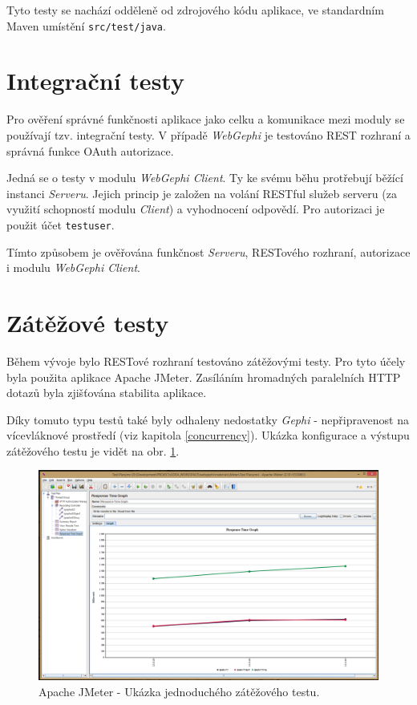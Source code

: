 \documentclass[thesis=M,czech]{FITthesis}[2014/05/6]
\begin{document}
Tyto testy se nachází odděleně od zdrojového kódu aplikace, ve standardním Maven
umístění \texttt{src/test/java}.

\section{Integrační testy}
Pro ověření správné funkčnosti aplikace jako celku a komunikace mezi moduly se
používají tzv. integrační testy. V případě \textit{WebGephi} je testováno REST
rozhraní a správná funkce OAuth autorizace.

Jedná se o testy v modulu \textit{WebGephi Client}. Ty ke svému běhu protřebují
běžící instanci \textit{Serveru}. Jejich princip je založen na volání RESTful
služeb serveru (za využití schopností modulu \textit{Client}) a vyhodnocení
odpovědí. Pro autorizaci je použit účet \texttt{testuser}.

Tímto způsobem je ověřována funkčnost \textit{Serveru}, RESTového rozhraní,
autorizace i modulu \textit{WebGephi Client}.

\section{Zátěžové testy}
Během vývoje bylo RESTové rozhraní testováno zátěžovými testy. Pro tyto účely
byla použita aplikace Apache JMeter\cite{jmeter}. Zasíláním
hromadných paralelních HTTP dotazů byla zjišťována stabilita aplikace. 

Díky tomuto typu testů také byly odhaleny nedostatky \textit{Gephi} -
nepřipravenost na vícevláknové prostředí (viz kapitola \ref{concurrency}).
Ukázka konfigurace a výstupu zátěžového testu je vidět na obr. \ref{fig:jmeter}.

\begin{figure}\centering
 	\includegraphics[width=1\textwidth]{images/prtsc/jmeter}
 	\caption[Apache JMeter - Ukázka jednoduchého zátěžového testu]{Apache JMeter - Ukázka jednoduchého zátěžového testu.\label{fig:jmeter}}
\end{figure}
\end{document}
